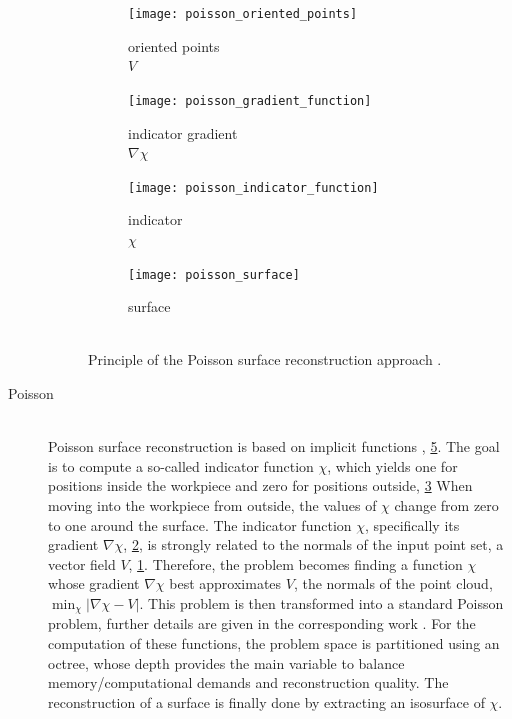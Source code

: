 \begin{description}
	\begin{figure}
		\centering
		\begin{subfigure}[b]{0.24\textwidth}
			\centering
			\texttt{[image: poisson\_oriented\_points]}
			\captionsetup{justification=centering}
			\caption{
				oriented points\\
				$V$
			}
			\label{fig:poisson_oriented_points}
		\end{subfigure}
		\begin{subfigure}[b]{0.24\textwidth}
			\centering
			\texttt{[image: poisson\_gradient\_function]}
			\captionsetup{justification=centering}
			\caption{
				indicator gradient\\
				$\nabla\chi$
			}
			\label{fig:poisson_gradient_function}
		\end{subfigure}
		\begin{subfigure}[b]{0.24\textwidth}
			\centering
			\texttt{[image: poisson\_indicator\_function]}
			\captionsetup{justification=centering}
			\caption{
				indicator\\
				$\chi$
			}
			\label{fig:poisson_indicator_function}
		\end{subfigure}
		\begin{subfigure}[b]{0.24\textwidth}
			\centering
			\texttt{[image: poisson\_surface]}
			\captionsetup{justification=centering}
			\caption{
				surface\\
				~
			}
			\label{fig:poisson_surface}
		\end{subfigure}
		\caption{
			Principle of the Poisson surface reconstruction approach \cite{poisson}.
		}
		\label{fig:poisson_principle}
	\end{figure}

	\item[Poisson] \hfill \\
	Poisson surface reconstruction is based on implicit functions \cite{poisson}, \cf \cref{fig:poisson_principle}.
	The goal is to compute a so-called indicator function $\chi$, which yields one for positions inside the workpiece and zero for positions outside, \cf \cref{fig:poisson_indicator_function}
	When moving into the workpiece from outside, the values of $\chi$ change from zero to one around the surface.
	The indicator function $\chi$, specifically its gradient $\nabla\chi$, \cf \cref{fig:poisson_gradient_function}, is strongly related to the normals of the input point set, a vector field $V$, \cf \cref{fig:poisson_oriented_points}.
	Therefore, the problem becomes finding a function $\chi$ whose gradient $\nabla\chi$ best approximates $V$, the normals of the point cloud, \ie $\min_\chi |\nabla\chi - V|$.
	This problem is then transformed into a standard Poisson problem, further details are given in the corresponding work \cite{poisson}.
	For the computation of these functions, the problem space is partitioned using an octree, whose depth provides the main variable to balance memory/computational demands and reconstruction quality.
	The reconstruction of a surface is finally done by extracting an isosurface of $\chi$.


\end{description}
